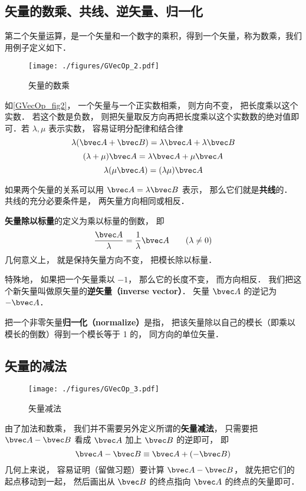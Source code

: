 \subsection{矢量的数乘、共线、逆矢量、归一化}
第二个矢量运算，是一个矢量和一个数字的乘积，得到一个矢量，称为数乘，我们用例子定义如下．

\begin{figure}[ht]
\centering
\texttt{[image: ./figures/GVecOp\_2.pdf]}
\caption{矢量的数乘} \label{GVecOp_fig2}
\end{figure}

如\autoref{GVecOp_fig2}， 一个矢量与一个正实数相乘， 则方向不变， 把长度乘以这个实数． 若这个数是负数， 则把矢量取反方向再把长度乘以这个实数数的绝对值即可．若 $\lambda, \mu$ 表示实数， 容易证明分配律和结合律
\begin{equation}
\lambda(\bvec A + \bvec B) = \lambda\bvec A + \lambda\bvec B
\end{equation}
\begin{equation}
(\lambda+\mu)\bvec A = \lambda\bvec A + \mu\bvec A
\end{equation}
\begin{equation}
\lambda(\mu\bvec A) = (\lambda\mu) \bvec A
\end{equation}

如果两个矢量的关系可以用 $\bvec A = \lambda\bvec B$ 表示， 那么它们就是\textbf{共线}的． 共线的充分必要条件是， 两矢量方向相同或相反．

\textbf{矢量除以标量}的定义为乘以标量的倒数， 即
\begin{equation}
\frac{\bvec A}{\lambda} = \frac{1}{\lambda} \bvec A \qquad (\lambda \ne 0)
\end{equation}
几何意义上， 就是保持矢量方向不变， 把模长除以标量．

特殊地， 如果把一个矢量乘以 $-1$， 那么它的长度不变， 而方向相反． 我们把这个新矢量叫做原矢量的\textbf{逆矢量（inverse vector）}． 矢量 $\bvec A$ 的逆记为 $-\bvec A$．

把一个非零矢量\textbf{归一化（normalize）}是指， 把该矢量除以自己的模长（即乘以模长的倒数）得到一个模长等于 1 的， 同方向的单位矢量．

\subsection{矢量的减法}

\begin{figure}[ht]
\centering
\texttt{[image: ./figures/GVecOp\_3.pdf]}
\caption{矢量减法} \label{GVecOp_fig3}
\end{figure}
由了加法和数乘， 我们并不需要另外定义所谓的\textbf{矢量减法}， 只需要把 $\bvec A - \bvec B$ 看成 $\bvec A$ 加上 $\bvec B$ 的逆即可， 即
\begin{equation}
\bvec A - \bvec B \equiv \bvec A + (-\bvec B)
\end{equation}
几何上来说， 容易证明（留做习题）要计算 $\bvec A - \bvec B$， 就先把它们的起点移动到一起， 然后画出从 $\bvec B$ 的终点指向 $\bvec A$ 的终点的矢量即可．

